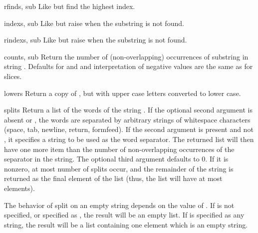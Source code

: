 \begin{funcdesc}{rfind}{s, sub}
  Like  but find the highest index.
\end{funcdesc}

\begin{funcdesc}{index}{s, sub}
  Like  but raise  when the
  substring is not found.
\end{funcdesc}

\begin{funcdesc}{rindex}{s, sub}
  Like  but raise  when the
  substring is not found.
\end{funcdesc}

\begin{funcdesc}{count}{s, sub}
  Return the number of (non-overlapping) occurrences of substring
   in string .
  Defaults for  and  and interpretation of
  negative values are the same as for slices.
\end{funcdesc}

\begin{funcdesc}{lower}{s}
  Return a copy of , but with upper case letters converted to
  lower case.
\end{funcdesc}

\begin{funcdesc}{split}{s}
  Return a list of the words of the string .  If the optional
  second argument  is absent or , the words are
  separated by arbitrary strings of whitespace characters (space, tab, 
  newline, return, formfeed).  If the second argument  is
  present and not , it specifies a string to be used as the 
  word separator.  The returned list will then have one more item
  than the number of non-overlapping occurrences of the separator in
  the string.  The optional third argument  defaults to
  0.  If it is nonzero, at most  number of splits occur,
  and the remainder of the string is returned as the final element of
  the list (thus, the list will have at most 
  elements).

  The behavior of split on an empty string depends on the value of .
  If  is not specified, or specified as , the result will
  be an empty list.  If  is specified as any string, the result will
  be a list containing one element which is an empty string.
\end{funcdesc}

